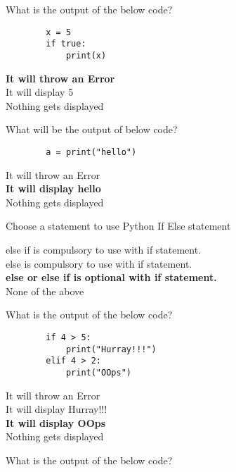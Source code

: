 \documentclass{exam}
\begin{document}
\begin{questions}
    \question What is the output of the below code?
    \begin{verbatim}
        x = 5
        if true:
            print(x)
    \end{verbatim}
    \begin{oneparchoices}
        \choice \textbf{It will throw an Error} \\
        \choice It will display 5 \\
        \choice Nothing gets displayed
    \end{oneparchoices}

    \question What will be the output of below code?
    \begin{verbatim}
        a = print("hello")
    \end{verbatim}
    \begin{oneparchoices}
        \choice It will throw an Error \\
        \choice \textbf{It will display hello} \\
        \choice Nothing gets displayed
    \end{oneparchoices}
    \question Choose a statement to use Python If Else statement

    \begin{oneparchoices}
        \choice else if is compulsory to use with if statement. \\
        \choice else is compulsory to use with if statement. \\
        \choice \textbf{else or else if is optional with if statement.} \\
        \choice None of the above
    \end{oneparchoices}
    \question What is the output of the below code?

    \begin{verbatim}
        if 4 > 5:
            print("Hurray!!!")
        elif 4 > 2:
            print("OOps")
    \end{verbatim}
    \begin{oneparchoices}
        \choice It will throw an Error \\
        \choice It will display Hurray!!! \\
        \choice \textbf{It will display OOps} \\
        \choice Nothing gets displayed
    \end{oneparchoices}

    \question What is the output of the below code?


\end{questions}
\end{document}
